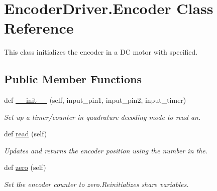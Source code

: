 \hypertarget{classEncoderDriver_1_1Encoder}{}\section{Encoder\+Driver.\+Encoder Class Reference}
\label{classEncoderDriver_1_1Encoder}


This class initializes the encoder in a DC motor with specified.  


\subsection*{Public Member Functions}
\begin{DoxyCompactItemize}
\item 
def \mbox{\hyperlink{classEncoderDriver_1_1Encoder_a5699cf699993f343adc3ad1c9b507157}{\+\_\+\+\_\+init\+\_\+\+\_\+}} (self, input\+\_\+pin1, input\+\_\+pin2, input\+\_\+timer)
\begin{DoxyCompactList}\small\item\em Set up a timer/counter in quadrature decoding mode to read an. \end{DoxyCompactList}\item 
def \mbox{\hyperlink{classEncoderDriver_1_1Encoder_a747368663b8d839634c7fe286b19e789}{read}} (self)
\begin{DoxyCompactList}\small\item\em Updates and returns the encoder position using the number in the. \end{DoxyCompactList}\item 
def \mbox{\hyperlink{classEncoderDriver_1_1Encoder_a6aafe0d52333d0d1facf1e79747c96db}{zero}} (self)
\begin{DoxyCompactList}\small\item\em Set the encoder counter to zero.\+Reinitializes share variables. \end{DoxyCompactList}\end{DoxyCompactItemize}
